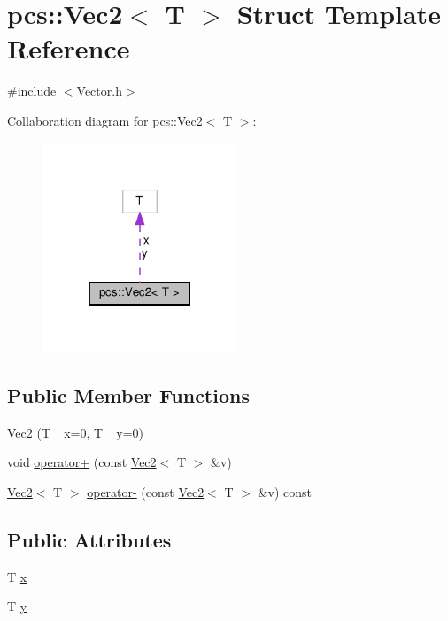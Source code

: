\hypertarget{structpcs_1_1Vec2}{}\section{pcs\+:\+:Vec2$<$ T $>$ Struct Template Reference}
\label{structpcs_1_1Vec2}


{\ttfamily \#include $<$Vector.\+h$>$}



Collaboration diagram for pcs\+:\+:Vec2$<$ T $>$\+:\nopagebreak
\begin{figure}[H]
\begin{center}
\leavevmode
\includegraphics[width=165pt]{structpcs_1_1Vec2__coll__graph}
\end{center}
\end{figure}
\subsection*{Public Member Functions}
\begin{DoxyCompactItemize}
\item 
\hyperlink{structpcs_1_1Vec2_ad4062fa4dce3e5a6789060114a27571d}{Vec2} (T \+\_\+x=0, T \+\_\+y=0)
\item 
void \hyperlink{structpcs_1_1Vec2_a58965c0a64fad2c35fa628dc0ec3b671}{operator+} (const \hyperlink{structpcs_1_1Vec2}{Vec2}$<$ T $>$ \&v)
\item 
\hyperlink{structpcs_1_1Vec2}{Vec2}$<$ T $>$ \hyperlink{structpcs_1_1Vec2_a1fb1ccb1a4a54b4529e5cfd7d79ed48d}{operator-\/} (const \hyperlink{structpcs_1_1Vec2}{Vec2}$<$ T $>$ \&v) const
\end{DoxyCompactItemize}
\subsection*{Public Attributes}
\begin{DoxyCompactItemize}
\item 
T \hyperlink{structpcs_1_1Vec2_a1fe4fba4477b300614ae69042d5ecc53}{x}
\item 
T \hyperlink{structpcs_1_1Vec2_a6aaf08a33b2d7c35070cc8ab32e8926e}{y}
\end{DoxyCompactItemize}


